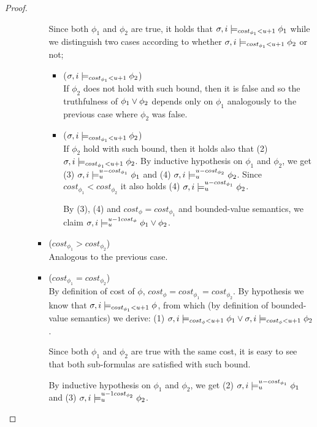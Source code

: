 \begin{theorem}
\begin{lemma}
\begin{proof}
\begin{itemize}
\begin{itemize}
\begin{itemize}
            Since both $\phi_1$ and $\phi_2$ are true, it holds that $\sigma,i \models_{cost_{\phi_1} < u + 1} \phi_1$ while we distinguish two cases according to whether $\sigma,i \models_{cost_{\phi_1} < u + 1} \phi_2$ or not;
            \begin{itemize}
                \item ($\sigma,i \models_{cost_{\phi_1} < u + 1} \phi_2$) \\
                If $\phi_2$ does not hold with such bound, then it is false and so the truthfulness of $\phi_1 \lor \phi_2$ depends only on $\phi_1$ analogously to the previous case where $\phi_2$ was false.
                \item ($\sigma,i \models_{cost_{\phi_1} < u + 1} \phi_2$) \\
                If $\phi_2$ hold with such bound, then it holds also that (2) $\sigma,i \models_{cost_{\phi_1} < u + 1} \phi_2$.
                By inductive hypothesis on $\phi_1$ and $\phi_2$, we get (3) $\sigma,i \models_{u}^{u-cost_{\phi_1}} \phi_1$ and (4) $\sigma,i \models_{u}^{u-cost_{\phi_2}} \phi_2$.
                Since $cost_{\phi_1} < cost_{\phi_2}$ it also holds (4) $\sigma,i \models_{u}^{u-cost_{\phi_1}} \phi_2$.

                By (3), (4) and $cost_{\phi} = cost_{\phi_1}$ and bounded-value semantics, we claim $\sigma,i \models_{u}^{u-1cost_\phi} \phi_1 \lor \phi_2$.
            \end{itemize}
            
            \item ($cost_{\phi_1} > cost_{\phi_2}$) \\
            Analogous to the previous case.
            
            \item ($cost_{\phi_1} = cost_{\phi_2}$) \\
            By definition of cost of $\phi$, $cost_\phi = cost_{\phi_1} = cost_{\phi_2}$.
            By hypothesis we know that $\sigma,i \models_{cost_{\phi_1} < u+1} \phi$, from which (by definition of bounded-value semantics) we derive: 
            (1) $\sigma,i \models_{cost_\phi < u+1} \phi_1 \lor \sigma,i \models_{cost_\phi < u+1} \phi_2$.

            Since both $\phi_1$ and $\phi_2$ are true with the same cost, it is easy to see that both sub-formulas are satisfied with such bound.

            By inductive hypothesis on $\phi_1$ and $\phi_2$, we get (2) $\sigma,i \models_{u}^{u-cost_{\phi_1}} \phi_1$ and (3) $\sigma,i \models_{u}^{u-1cost_{\phi_2}} \phi_2$.


\end{itemize}
\end{itemize}
\end{itemize}
\end{proof}
\end{lemma}
\end{theorem}
